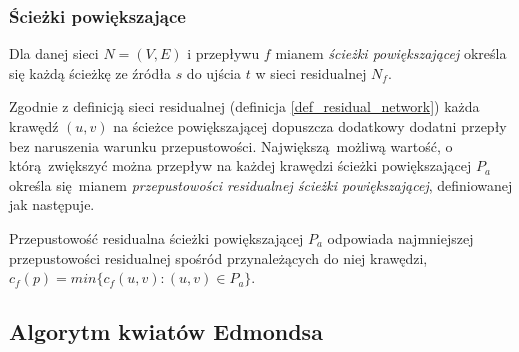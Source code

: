 \subsubsection{Ścieżki powiększające}
  \begin{definition}
    Dla danej sieci $N=(V,E)$ i przepływu $f$ mianem \emph{ścieżki powiększającej} określa się każdą ścieżkę ze źródła $s$ do ujścia $t$ w sieci residualnej $N_f$.
  \end{definition}
  \par{
    Zgodnie z definicją sieci residualnej (definicja \ref{def_residual_network}) każda krawędź $(u, v)$ na ścieżce powiększającej dopuszcza dodatkowy dodatni przepły bez naruszenia warunku przepustowości.
    Największą możliwą wartość, o którą zwiększyć można przepływ na każdej krawędzi ścieżki powiększającej $P_a$ określa się mianem \emph{przepustowości residualnej ścieżki powiększającej}, definiowanej jak następuje.
    \begin{definition}
      Przepustowość residualna ścieżki powiększającej $P_a$ odpowiada najmniejszej przepustowości residualnej spośród przynależących do niej krawędzi, $c_f(p) = min\{c_f(u, v):(u, v)\in P_a\}$.
    \end{definition}
  }
\subsection{Algorytm kwiatów Edmondsa}\label{ss_edmonds}




